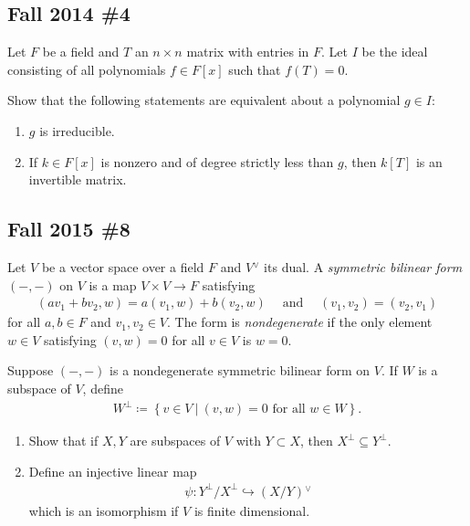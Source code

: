 \hypertarget{fall-2014-4}{%
\subsection{Fall 2014 \#4}\label{fall-2014-4}}

Let \(F\) be a field and \(T\) an \(n\times n\) matrix with entries in
\(F\). Let \(I\) be the ideal consisting of all polynomials
\(f\in F[x]\) such that \(f(T) =0\).

Show that the following statements are equivalent about a polynomial
\(g\in I\):

\begin{enumerate}
\def\labelenumi{\alph{enumi}.}
\item
  \(g\) is irreducible.
\item
  If \(k\in F[x]\) is nonzero and of degree strictly less than \(g\),
  then \(k[T]\) is an invertible matrix.
\end{enumerate}

\hypertarget{fall-2015-8}{%
\subsection{Fall 2015 \#8}\label{fall-2015-8}}

Let \(V\) be a vector space over a field \(F\) and \(V {}^{ \vee }\) its
dual. A \emph{symmetric bilinear form} \(({-}, {-})\) on \(V\) is a map
\(V\times V\to F\) satisfying
\begin{align*}
(av_1 + b v_2, w) = a(v_1, w) + b(v_2, w) {\quad \operatorname{and} \quad} (v_1, v_2) = (v_2, v_1)
\end{align*}
for all \(a, b\in F\) and \(v_1, v_2 \in V\). The form is
\emph{nondegenerate} if the only element \(w\in V\) satisfying
\((v, w) = 0\) for all \(v\in V\) is \(w=0\).

Suppose \(({-}, {-})\) is a nondegenerate symmetric bilinear form on
\(V\). If \(W\) is a subspace of \(V\), define
\begin{align*}
W^{\perp} \coloneqq\left\{{v\in V {~\mathrel{\Big\vert}~}(v, w) = 0 \text{ for all } w\in W}\right\}
.\end{align*}

\begin{enumerate}
\def\labelenumi{\alph{enumi}.}
\item
  Show that if \(X, Y\) are subspaces of \(V\) with \(Y\subset X\), then
  \(X^{\perp} \subseteq Y^{\perp}\).
\item
  Define an injective linear map
  \begin{align*}
  \psi: Y^{\perp}/X^{\perp} \hookrightarrow(X/Y) {}^{ \vee }
  \end{align*}
  which is an isomorphism if \(V\) is finite dimensional.
\end{enumerate}

